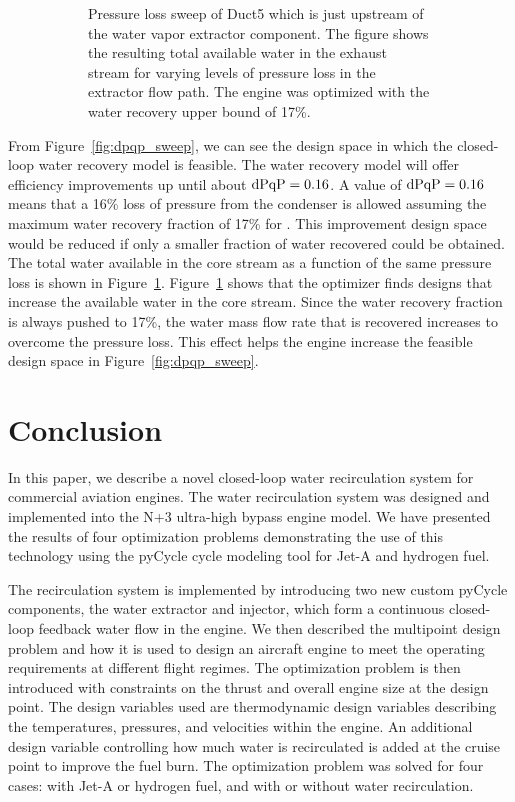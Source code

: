 \documentclass[conf]{new-aiaa}
\begin{document}
\begin{figure}[hbt!]
\begin{subfigure}[t]{0.49\textwidth}
        \caption{Pressure loss sweep of Duct5 which is just upstream of the water vapor extractor component.
            The figure shows the resulting total available water in the exhaust stream for varying levels of pressure loss in the extractor flow path.
            The engine was optimized with the water recovery upper bound of 17\%.
        }
        \label{fig:dpqp_wdot}
    \end{subfigure}
    \caption{}
    \label{fig:dpqp_study}
\end{figure}

From Figure~\ref{fig:dpqp_sweep}, we can see the design space in which the closed-loop water recovery model is feasible.
The water recovery model will offer efficiency improvements up until about $\rm{dPqP} = 0.16$.
A value of $\rm{dPqP} = 0.16$ means that a 16\% loss of pressure from the condenser is allowed assuming the maximum water recovery fraction of 17\% for .
This improvement design space would be reduced if only a smaller fraction of water recovered could be obtained.
The total water available in the core stream as a function of the same pressure loss is shown in Figure~\ref{fig:dpqp_wdot}.
Figure~\ref{fig:dpqp_wdot} shows that the optimizer finds designs that increase the available water in the core stream.
Since the water recovery fraction is always pushed to 17\%, the water mass flow rate that is recovered increases to overcome the pressure loss.
This effect helps the engine increase the feasible design space in Figure~\ref{fig:dpqp_sweep}.


\section{Conclusion}
\label{sec:conc}
In this paper, we describe a novel closed-loop water recirculation system for commercial aviation engines.
The water recirculation system was designed and implemented into the N+3 ultra-high bypass engine model.
We have presented the results of four optimization problems demonstrating the use of this technology using the pyCycle cycle modeling tool for Jet-A and hydrogen fuel.

The recirculation system is implemented by introducing two new custom pyCycle components, the water extractor and injector, which form a continuous closed-loop feedback water flow in the engine.
We then described the multipoint design problem and how it is used to design an aircraft engine to meet the operating requirements at different flight regimes.
The optimization problem is then introduced with constraints on the thrust and overall engine size at the design point.
The design variables used are thermodynamic design variables describing the temperatures, pressures, and velocities within the engine.
An additional design variable controlling how much water is recirculated is added at the cruise point to improve the fuel burn.
The optimization problem was solved for four cases: with Jet-A or hydrogen fuel, and with or without water recirculation.
\end{document}
